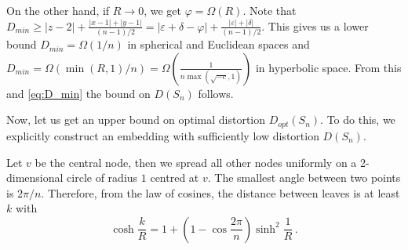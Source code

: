 \documentclass[runningheads]{llncs}
\begin{document}

On the other hand, if $R \to 0$, we get $\varphi = \Omega(R)$.
Note that $D_{min} \ge |z-2| + \frac{|x-1| + |y-1|}{(n-1)/2} =  |\varepsilon + \delta - \varphi| + \frac{|\varepsilon| + |\delta|}{(n-1)/2}$. This gives us a lower bound $D_{min} = \Omega(1/n)$ in spherical and Euclidean spaces and 
$D_{min} = \Omega(\min(R,1)/n) = \Omega\left(\frac{1}{n\max\left(\sqrt{-c},1\right)}\right)$ in hyperbolic space.
From this and \eqref{eq:D_min} the bound on $D(S_n)$ follows.

Now, let us get an upper bound on optimal distortion $D_{opt}(S_n)$. To do this, we explicitly construct an embedding with sufficiently low distortion $D(S_n)$.

Let $v$ be the central node, then we spread all other nodes uniformly on a 2-dimensional circle of radius $1$ centred at $v$. The smallest angle between two points is $2 \pi / n$. Therefore, from the law of cosines, the distance between leaves is at least $k$ with
\[
\cosh \frac{k}{R} = 1  + \left(1 -  \cos \frac{2 \pi}{n}\right)  \sinh^2 \frac{1}{R} \,.
\]
\end{document}
